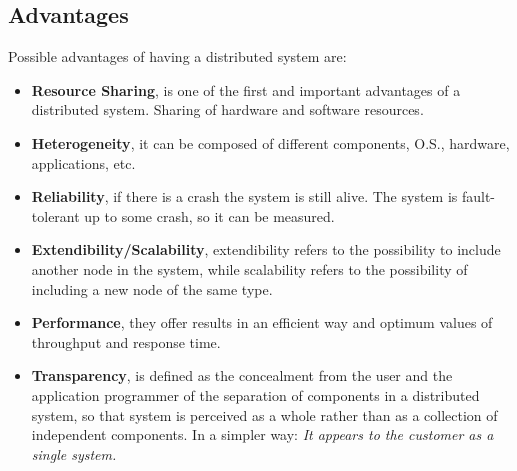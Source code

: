 \documentclass[11pt,a4paper]{article}
\begin{document}
\subsection{Advantages}
Possible advantages of having a distributed system are:
\begin{itemize}
    \item \textbf{Resource Sharing}, is one of the first and important advantages of a distributed system. Sharing of hardware and software resources. 
    \item \textbf{Heterogeneity}, it can be composed of different components, O.S., hardware, applications, etc.
    \item \textbf{Reliability}, if there is a crash the system is still alive. The system is fault-tolerant up to some crash, so it can be measured.
    \item \textbf{Extendibility/Scalability}, extendibility refers to the possibility to include another node in the system, while scalability refers to the possibility of including a new node of the same type.
    \item \textbf{Performance}, they offer results in an efficient way and optimum values of throughput and response time.
    \item \textbf{Transparency}, is defined as the concealment from the user and the application programmer of the separation of components in a distributed system, so that system is perceived as a whole rather than as a collection of independent components. In a simpler way: \textit{It appears to the customer as a single system.}
\end{itemize}
\end{document}
